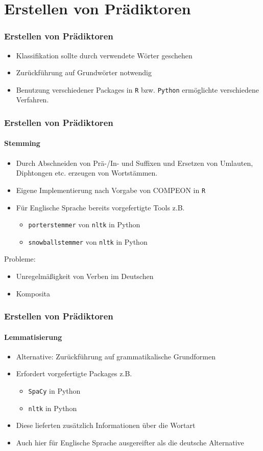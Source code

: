 \documentclass{beamer}
\begin{document}
\section{Erstellen von Prädiktoren}
\begin{frame}
\frametitle{Erstellen von Prädiktoren}
\begin{itemize}\itemsep12pt
\item Klassifikation sollte durch verwendete Wörter geschehen
\item Zurückführung auf Grundwörter notwendig
\item Benutzung verschiedener Packages in \texttt{R} bzw. \texttt{Python} ermöglichte verschiedene Verfahren.
\end{itemize}
\end{frame}

\begin{frame}
\frametitle{Erstellen von Prädiktoren}
\framesubtitle{Stemming}
\begin{itemize}\itemsep12pt
\item Durch Abschneiden von Prä-/In- und Suffixen und Ersetzen von Umlauten, Diphtongen etc. erzeugen von Wortstämmen.
\item Eigene Implementierung nach Vorgabe von COMPEON in \texttt{R}
\item Für Englische Sprache bereits vorgefertigte Tools z.B. 
\begin{itemize}
\item \texttt{porterstemmer} von \texttt{nltk} in Python
\item \texttt{snowballstemmer} von \texttt{nltk} in Python
\end{itemize}
\end{itemize}
Probleme:
\begin{itemize}
\item Unregelmäßigkeit von Verben im Deutschen
\item Komposita
\end{itemize} 
\end{frame}

\begin{frame}
\frametitle{Erstellen von Prädiktoren}
\framesubtitle{Lemmatisierung}
\begin{itemize}\itemsep12pt
\item Alternative: Zurückführung auf grammatikalische Grundformen
\item Erfordert vorgefertigte Packages z.B.
\begin{itemize}
\item \texttt{SpaCy} in Python
\item \texttt{nltk} in Python
\end{itemize}
\item Diese lieferten zusätzlich Informationen über die Wortart
\item Auch hier für Englische Sprache ausgereifter als die deutsche Alternative
\end{itemize}
\end{frame}
\end{document}

